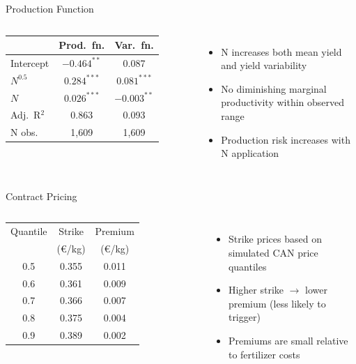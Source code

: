 \documentclass[aspectratio=169,12pt]{beamer}
\begin{document}
\begin{frame}{Production Function}
\begin{columns}[T]
\small
\begin{table}
\centering
\begin{tabular}{lcc}
\toprule
 & Prod.\ fn. & Var.\ fn. \\
\midrule
Intercept & $-0.464^{**}$ & 0.087 \\
$N^{0.5}$ & $0.284^{***}$ & $0.081^{***}$ \\
$N$ & $0.026^{***}$ & $-0.003^{**}$ \\
\midrule
Adj.\ R$^2$ & 0.863 & 0.093 \\
N obs. & 1,609 & 1,609 \\
\bottomrule
\end{tabular}
\end{table}

\begin{itemize}
    \item N increases both mean yield and yield variability
    \item No diminishing marginal productivity within observed range
    \item Production risk increases with N application
\end{itemize}
\end{columns}
\end{frame}

\begin{frame}{Contract Pricing}
\begin{columns}[T]
\begin{table}
\centering
\small
\begin{tabular}{ccc}
\toprule
Quantile & Strike & Premium \\
 & (\euro/kg) & (\euro/kg) \\
\midrule
0.5 & 0.355 & 0.011 \\
0.6 & 0.361 & 0.009 \\
0.7 & 0.366 & 0.007 \\
0.8 & 0.375 & 0.004 \\
0.9 & 0.389 & 0.002 \\
\bottomrule
\end{tabular}
\end{table}

\begin{itemize}
    \item Strike prices based on simulated CAN price quantiles
    \item Higher strike $\rightarrow$ lower premium (less likely to trigger)
    \item Premiums are small relative to fertilizer costs
\end{itemize}
\end{columns}
\end{frame}
\end{document}
